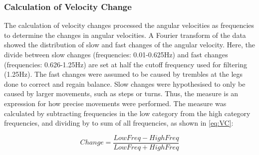 \subsubsection{Calculation of Velocity Change}

The calculation of velocity changes processed the angular velocities as frequencies to determine the changes in angular velocities. A Fourier transform of the data showed the distribution of slow and fast changes of the angular velocity. Here, the divide between slow changes (frequencies: 0.01-0.625Hz) and fast changes (frequencies: 0.626-1.25Hz) are set at half the cutoff frequency used for filtering (1.25Hz).
The fast changes were assumed to be caused by trembles at the legs done to correct and regain balance. Slow changes were hypothesised to only be caused by larger movements, such as steps or turns. Thus, the measure is an expression for how precise movements were performed. The measure was calculated by subtracting frequencies in the low category from the high category frequencies, and dividing by to sum of all frequencies, as shown in \eqref{eq:VC}:


\begin{equation} \label{eq:VC}
Change = \frac{LowFreq-HighFreq}{LowFreq+HighFreq}
\end{equation}


